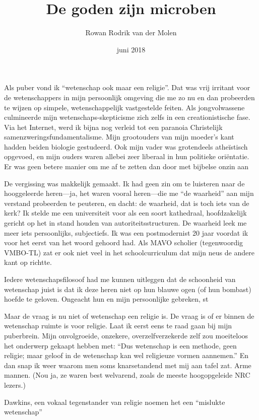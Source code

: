 \documentclass[12pt,a4paper]{article}
\begin{document}
\title{De goden zijn microben}
\author{Rowan Rodrik van der Molen}
\date{juni 2018}
\maketitle


Als puber vond ik “wetenschap ook maar een religie”. Dat was vrij irritant voor de wetenschappers in mijn persoonlijk omgeving die me zo nu en dan probeerden te wijzen op simpele, wetenschappelijk vastgestelde feiten. Als jongvolwassene culmineerde mijn wetenschaps-skepticisme zich zelfs in een creationistische fase. Via het Internet, werd ik bijna nog verleid tot een paranoia Christelijk samenzweringsfundamentalisme.  Mijn grootouders van mijn moeder's kant hadden beiden biologie gestudeerd. Ook mijn vader was grotendeels atheïstisch opgevoed, en mijn ouders waren allebei zeer liberaal in hun politieke oriëntatie. Er was geen betere manier om me af te zetten dan door met bijbelse onzin aan 

De vergissing was makkelijk gemaakt. Ik had geen zin om te luisteren naar de hooggeleerde heren—ja, het waren vooral heren—die me “de waarheid” aan mijn verstand probeerden te peuteren, en dacht: de waarheid, dat is toch iets van de kerk? Ik stelde me een universiteit voor als een soort kathedraal, hoofdzakelijk gericht op het in stand houden van autoriteitsstructuren. De waarheid leek me meer iets persoonlijks, subjectiefs. Ik was een postmodernist 20 jaar voordat ik voor het eerst van het woord gehoord had. Als MAVO scholier (tegenwoordig VMBO-TL) zat er ook niet veel in het schoolcurriculum dat mijn neus de andere kant op richtte.

Iedere wetenschapsfilosoof had me kunnen uitleggen dat de schoonheid van wetenschap juist is dat ik deze heren niet op hun blauwe ogen (of hun bombast) hoefde te geloven. Ongeacht hun en mijn persoonlijke gebreken, st

Maar de vraag is nu niet of wetenschap een religie is. De vraag is of er binnen de wetenschap ruimte is voor religie. Laat ik eerst eens te raad gaan bij mijn puberbrein. Mijn onvolgroeide, onzekere, overzelfverzekerde zelf zou moeiteloos het onderwerp gekaapt hebben met: “Dus wetenschap is een methode, geen religie; maar geloof in de wetenschap kan wel religieuze vormen aannemen.” En dan snap ik weer waarom men soms knarsetandend met mij aan tafel zat. Arme mannen. (Nou ja, ze waren best welvarend, zoals de meeste hoogopgeleide NRC lezers.)

Dawkins, een vokaal tegenstander van religie noemen het een “mislukte wetenschap”
\end{document}
